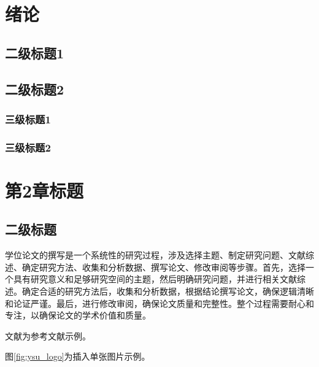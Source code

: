 \documentclass[master,academic]{ysuthesis} %
\begin{document}

	\customizedtableofcontents

	\chapter{绪论}


	\section{二级标题1}


	\section{二级标题2}


	\subsection{三级标题1}


	\subsection{三级标题2}


	\chapter{第2章标题}

	\section{二级标题}

		学位论文的撰写是一个系统性的研究过程，涉及选择主题、制定研究问题、文献综述、确定研究方法、收集和分析数据、撰写论文、修改审阅等步骤。首先，选择一个具有研究意义和足够研究空间的主题，然后明确研究问题，并进行相关文献综述。确定合适的研究方法后，收集和分析数据，根据结论撰写论文，确保逻辑清晰和论证严谨。最后，进行修改审阅，确保论文质量和完整性。整个过程需要耐心和专注，以确保论文的学术价值和质量。

		文献\cite{texbook,latex:companion,latex2e,knuth:1984,lesk:1977}为参考文献示例。

		图\ref{fig:ysu_logo}为插入单张图片示例。
\end{document}
